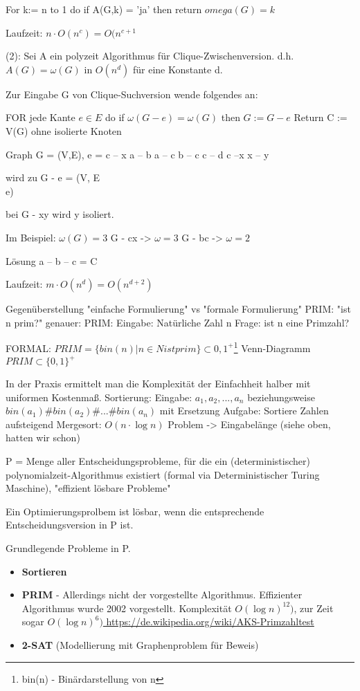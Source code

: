 \documentclass{article} %
\begin{document}
\begin{framed}
For k:= n to 1 do
	if A(G,k) = 'ja'
	then return $omega (G) = k $
\end{framed}
Laufzeit: $n \cdot O(n^c) = O(n^{c+1}$


(2): Sei A ein polyzeit Algorithmus für Clique-Zwischenversion.
d.h. $A(G) = \omega (G)$ in $O(n^d)$ für eine Konstante d.

Zur Eingabe G von Clique-Suchversion wende folgendes an:
\begin{framed}
FOR jede Kante $e \in E$ do
	if $\omega (G - e ) = \omega (G)$
	then $G := G - e$
Return C := V(G) ohne isolierte Knoten
\end{framed}

Graph G = (V,E), e = c -- x
a -- b
a -- c
b -- c
c -- d
c --x %
x -- y

wird zu G - e = (V, E \\ {e})

bei G - xy wird y isoliert.

Im Beispiel: $\omega (G) = 3$
G - cx -> $\omega = 3$
G - bc -> $\omega = 2$


Lösung a -- b -- c = C

Laufzeit: $m \cdot O(n^d) = O(n^{d+2})$

Gegenüberstellung "einfache Formulierung" vs "formale Formulierung"
PRIM: "ist n prim?"
genauer: 
PRIM:
Eingabe: Natürliche Zahl n
Frage: ist n eine Primzahl?

FORMAL: $PRIM = \{ bin(n) |  n \in N ist prim\} \subset {0,1}^+$\footnote{bin(n) - Binärdarstellung von n}
Venn-Diagramm $PRIM \subset \{0,1\}^+$

In der Praxis ermittelt man die Komplexität der Einfachheit halber mit uniformen Kostenmaß.
Sortierung:
Eingabe: $a_1, a_2,...,a_n$ beziehungsweise $bin(a_1) \# bin(a_2) \# ... \# bin(a_n) $ mit Ersetzung 
Aufgabe: Sortiere Zahlen aufsteigend
Mergesort: $O(n \cdot \log n)$
Problem -> Eingabelänge (siehe oben, hatten wir schon)


P = Menge aller Entscheidungsprobleme, für die ein (deterministischer) polynomialzeit-Algorithmus existiert (formal via Deterministischer Turing Maschine), "effizient lösbare Probleme"

Ein Optimierungsprolbem ist lösbar, wenn die entsprechende Entscheidungsversion in P ist.

Grundlegende Probleme in P.
\begin{itemize}
\item\textbf{Sortieren}
\item\textbf{PRIM} - Allerdings nicht der vorgestellte Algorithmus. Effizienter Algorithmus wurde 2002 vorgestellt. Komplexität $O(\log n)^{12})$, zur Zeit sogar $O(\log n)^{6})$\url{ https://de.wikipedia.org/wiki/AKS-Primzahltest}
\item\textbf{2-SAT}  (Modellierung mit Graphenproblem für Beweis)
\end{itemize}



\end{document}
